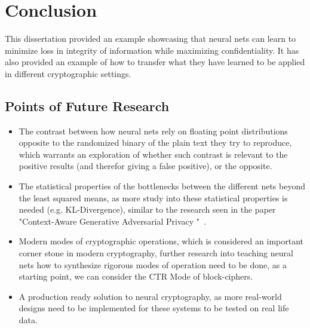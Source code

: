 \documentclass[a4paper, 12pt]{report}
\begin{document}
\chapter{Conclusion}\label{sec:conclusion}
\begin{center}
	\begin{minipage}{0.8\textwidth}
		\justify
		This dissertation provided an example showcasing that neural nets can learn to minimize loss in integrity of information while maximizing confidentiality. It has also provided an example of how to transfer what they have learned to be applied in different cryptographic settings.
	\end{minipage}
\end{center}
\section*{\textbf{Points of Future Research}}
\begin{itemize}[nosep]
	\item The contrast between how neural nets rely on floating point distributions opposite to the randomized binary of the plain text they try to reproduce, which warrants an exploration of whether such contrast is relevant to the positive results (and therefor giving a false positive), or the opposite.
	\item The statistical properties of the bottlenecks between the different nets beyond the least squared means, as more study into these statistical properties is needed (e.g. KL-Divergence), similar to the research seen in the paper "Context-Aware Generative Adversarial Privacy
	"~\citep{e19120656}.
	\item Modern modes of cryptographic operations, which is considered an important corner stone in modern cryptography, further research into teaching neural nets how to synthesize rigorous modes of operation need to be done, as a starting point, we can consider the CTR Mode of block-ciphers.~\citep{BlockCipherModes}
	\item A production ready solution to neural cryptography, as more real-world designs need to be implemented for these systems to be tested on real life data.
\end{itemize}
\end{document}
